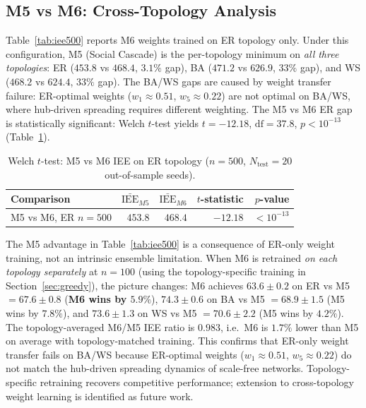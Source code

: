 \documentclass[review,12pt]{elsarticle}
\begin{document}
\subsection{M5 vs M6: Cross-Topology Analysis}
\label{sec:iee_comparison}

Table~\ref{tab:iee500} reports M6 weights trained on ER topology only.
Under this configuration, M5 (Social Cascade) is the per-topology minimum on
\emph{all three topologies}: ER ($453.8$ vs $468.4$, $3.1\%$ gap), BA
($471.2$ vs $626.9$, $33\%$ gap), and WS ($468.2$ vs $624.4$, $33\%$ gap).
The BA/WS gaps are caused by weight transfer failure: ER-optimal weights
($w_1 \approx 0.51$, $w_5 \approx 0.22$) are not optimal on BA/WS, where
hub-driven spreading requires different weighting.
The M5 vs M6 ER gap is statistically significant: Welch $t$-test yields
$t = -12.18$, $\mathrm{df} = 37.8$, $p < 10^{-13}$ (Table~\ref{tab:ttest}).

\begin{table}[htbp]
  \caption{Welch $t$-test: M5 vs M6 IEE on ER topology ($n=500$,
           $N_{\mathrm{test}}=20$ out-of-sample seeds).}
  \label{tab:ttest}
  \centering
  \small
  \begin{tabular}{lrrrr}
    \toprule
    Comparison & $\bar{\mathrm{IEE}}_{M5}$ & $\bar{\mathrm{IEE}}_{M6}$
               & $t$-statistic & $p$-value \\
    \midrule
    M5 vs M6, ER $n=500$ & $453.8$ & $468.4$ & $-12.18$ & $<10^{-13}$ \\
    \bottomrule
  \end{tabular}
\end{table}

The M5 advantage in Table~\ref{tab:iee500} is a consequence of ER-only weight
training, not an intrinsic ensemble limitation.  When M6 is retrained
\emph{on each topology separately} at $n=100$ (using the topology-specific
training in Section~\ref{sec:greedy}), the picture changes: M6 achieves
$63.6 \pm 0.2$ on ER vs M5 $= 67.6 \pm 0.8$ (\textbf{M6 wins by $5.9\%$}),
$74.3 \pm 0.6$ on BA vs M5 $= 68.9 \pm 1.5$ (M5 wins by $7.8\%$), and
$73.6 \pm 1.3$ on WS vs M5 $= 70.6 \pm 2.2$ (M5 wins by $4.2\%$).
The topology-averaged M6/M5 IEE ratio is $0.983$, i.e.\ M6 is $1.7\%$ lower
than M5 on average with topology-matched training.
This confirms that ER-only weight transfer fails on BA/WS because ER-optimal
weights ($w_1{\approx}0.51$, $w_5{\approx}0.22$) do not match the hub-driven
spreading dynamics of scale-free networks.  Topology-specific retraining
recovers competitive performance; extension to cross-topology weight learning
is identified as future work.
\end{document}
